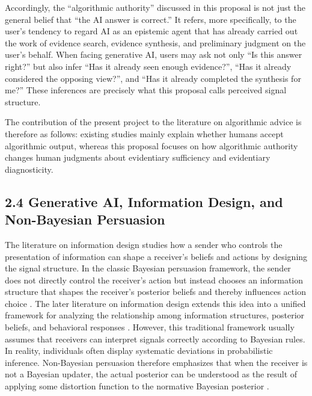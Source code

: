 Accordingly, the ``algorithmic authority'' discussed in this proposal is not just the general belief that ``the AI answer is correct.'' It refers, more specifically, to the user's tendency to regard AI as an epistemic agent that has already carried out the work of evidence search, evidence synthesis, and preliminary judgment on the user's behalf. When facing generative AI, users may ask not only ``Is this answer right?'' but also infer ``Has it already seen enough evidence?'', ``Has it already considered the opposing view?'', and ``Has it already completed the synthesis for me?'' These inferences are precisely what this proposal calls perceived signal structure.

The contribution of the present project to the literature on algorithmic advice is therefore as follows: existing studies mainly explain whether humans accept algorithmic output, whereas this proposal focuses on how algorithmic authority changes human judgments about evidentiary sufficiency and evidentiary diagnosticity.

\subsection*{2.4 Generative AI, Information Design, and Non-Bayesian Persuasion}

The literature on information design studies how a sender who controls the presentation of information can shape a receiver's beliefs and actions by designing the signal structure. In the classic Bayesian persuasion framework, the sender does not directly control the receiver's action but instead chooses an information structure that shapes the receiver's posterior beliefs and thereby influences action choice \citep{KamenicaGentzkow2011}. The later literature on information design extends this idea into a unified framework for analyzing the relationship among information structures, posterior beliefs, and behavioral responses \citep{BergemannMorris2019}. However, this traditional framework usually assumes that receivers can interpret signals correctly according to Bayesian rules. In reality, individuals often display systematic deviations in probabilistic inference. Non-Bayesian persuasion therefore emphasizes that when the receiver is not a Bayesian updater, the actual posterior can be understood as the result of applying some distortion function to the normative Bayesian posterior \citep{deClippelZhang2020}.

